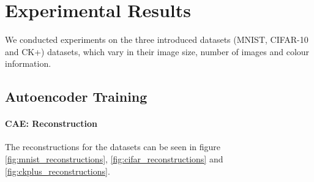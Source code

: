 \documentclass{article}
\begin{document}
      


\section{Experimental Results}
  We conducted experiments on the three introduced datasets (MNIST, CIFAR-10 and CK+) datasets, which vary in their image size, number of images and colour information.

  
  \subsection{Autoencoder Training}


    \paragraph{CAE: Reconstruction}
    The reconstructions for the datasets can be seen in figure \ref{fig:mnist_reconstructions}, \ref{fig:cifar_reconstructions} and \ref{fig:ckplus_reconstructions}.

\end{document}
